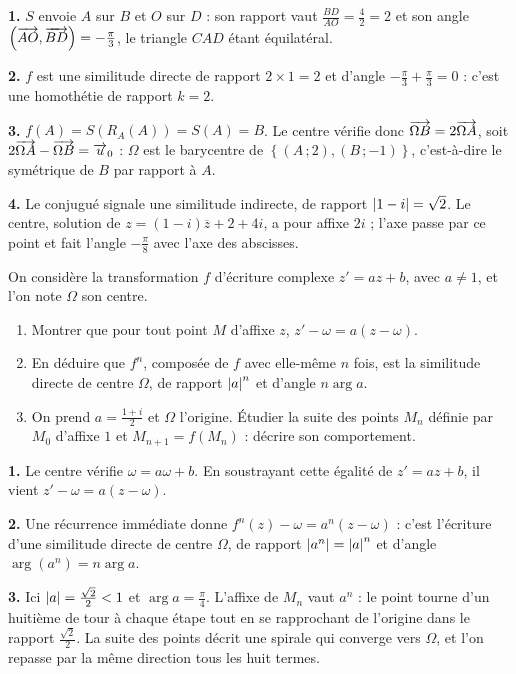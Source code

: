\begin{corrige}
\textbf{1.} $S$ envoie $A$ sur $B$ et $O$ sur $D$ : son rapport vaut
$\frac{BD}{AO} = \frac{4}{2} = 2$ et son angle
$\left(\overrightarrow{AO},\overrightarrow{BD}\right) = -\frac{\pi}{3}$, le triangle $CAD$ étant
équilatéral.

\textbf{2.} $f$ est une similitude directe de rapport $2 \times 1 = 2$ et
d'angle $-\frac{\pi}{3}+\frac{\pi}{3} = 0$ : c'est une homothétie de rapport
$k = 2$.

\textbf{3.} $f(A) = S\left(R_{A}(A)\right) = S(A) = B$. Le centre vérifie
donc $\overrightarrow{\Omega B} = 2\overrightarrow{\Omega A}$, soit
$2\overrightarrow{\Omega A}-\overrightarrow{\Omega B} = \overrightarrow{u}_{0}$ : $\Omega$ est le barycentre
de $\left\{(A\,;2),(B\,;-1)\right\}$, c'est-à-dire le symétrique de $B$ par
rapport à $A$.

\textbf{4.} Le conjugué signale une similitude indirecte, de rapport
$\left|1-i\right| = \sqrt2$. Le centre, solution de $z = (1-i)\overline z+2+4i$, a
pour affixe $2i$ ; l'axe passe par ce point et fait l'angle
$-\frac{\pi}{8}$ avec l'axe des abscisses.
\end{corrige}

\begin{concours}
On considère la transformation $f$ d'écriture complexe
$z' = az+b$, avec $a \neq 1$, et l'on note $\Omega$ son centre.

\begin{enumerate}[label=\textbf{\arabic*.}, leftmargin=*, itemsep=0.25em]
  \item Montrer que pour tout point $M$ d'affixe $z$,
        $z'-\omega = a(z-\omega)$.
  \item En déduire que $f^{n}$, composée de $f$ avec elle-même $n$ fois, est
        la similitude directe de centre $\Omega$, de rapport $\left|a\right|^{n}$ et
        d'angle $n\arg a$.
  \item On prend $a = \frac{1+i}{2}$ et $\Omega$ l'origine. Étudier la suite
        des points $M_{n}$ définie par $M_{0}$ d'affixe $1$ et
        $M_{n+1} = f(M_{n})$ : décrire son comportement.
\end{enumerate}
\end{concours}

\begin{corrige}
\textbf{1.} Le centre vérifie $\omega = a\omega+b$. En soustrayant cette
égalité de $z' = az+b$, il vient $z'-\omega = a(z-\omega)$.

\textbf{2.} Une récurrence immédiate donne
$f^{n}(z)-\omega = a^{n}(z-\omega)$ : c'est l'écriture d'une similitude
directe de centre $\Omega$, de rapport $\left|a^{n}\right| = \left|a\right|^{n}$ et d'angle
$\arg\!\left(a^{n}\right) = n\arg a$.

\textbf{3.} Ici $\left|a\right| = \frac{\sqrt2}{2}<1$ et $\arg a = \frac{\pi}{4}$.
L'affixe de $M_{n}$ vaut $a^{n}$ : le point tourne d'un huitième de tour à
chaque étape tout en se rapprochant de l'origine dans le rapport
$\frac{\sqrt2}{2}$. La suite des points décrit une spirale qui converge vers
$\Omega$, et l'on repasse par la même direction tous les huit termes.
\end{corrige}

